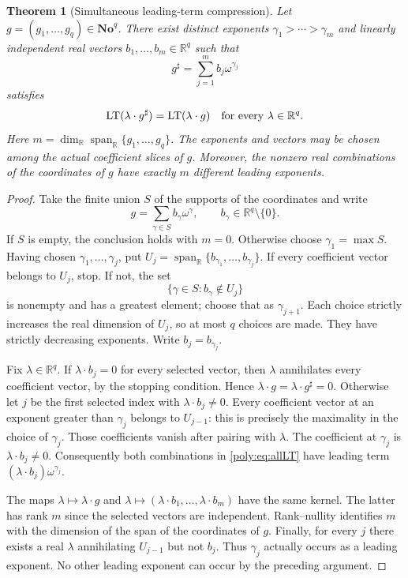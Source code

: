 \documentclass[11pt,a4paper]{article}
\numberwithin{equation}{section}
\newtheorem{theorem}{Theorem}[section]
\theoremstyle{plain}
\newcommand{\No}{\mathbf{No}}
\newcommand{\R}{\mathbb R}
\newcommand{\LT}{\operatorname{LT}}
\newcommand{\Span}{\operatorname{span}_{\R}}%
\begin{document}
\begin{theorem}[Simultaneous leading-term compression]\label{poly:thm:pivot}
Let $g=(g_1,\ldots,g_q)\in\No^q$. There exist distinct exponents
$\gamma_1>\cdots>\gamma_m$ and linearly independent real vectors
$b_1,\ldots,b_m\in\R^q$ such that
\begin{equation}\label{poly:eq:sharp}
 g^\sharp=\sum_{j=1}^m b_j\omega^{\gamma_j}
\end{equation}
satisfies
\begin{equation}\label{poly:eq:allLT}
 \LT(\lambda\cdot g^\sharp)=\LT(\lambda\cdot g)
 \quad\hbox{for every }\lambda\in\R^q.
\end{equation}
Here $m=\dim_{\R}\Span\{g_1,\ldots,g_q\}$. The exponents and vectors may be
chosen among the actual coefficient slices of $g$. Moreover, the nonzero
real combinations of the coordinates of $g$ have exactly $m$ different
leading exponents.
\end{theorem}
\begin{proof}
Take the finite union $S$ of the supports of the coordinates and write
\[
 g=\sum_{\gamma\in S}b_\gamma\omega^\gamma,
 \qquad b_\gamma\in\R^q\setminus\{0\}.
\]
If $S$ is empty, the conclusion holds with $m=0$. Otherwise choose
$\gamma_1=\max S$. Having chosen $\gamma_1,\ldots,\gamma_j$, put
$U_j=\Span\{b_{\gamma_1},\ldots,b_{\gamma_j}\}$. If every coefficient
vector belongs to $U_j$, stop. If not, the set
\[
 \{\gamma\in S:b_\gamma\notin U_j\}
\]
is nonempty and has a greatest element; choose that as $\gamma_{j+1}$.
Each choice strictly increases the real dimension of $U_j$, so at most
$q$ choices are made. They have strictly decreasing exponents. Write
$b_j=b_{\gamma_j}$.

Fix $\lambda\in\R^q$. If $\lambda\cdot b_j=0$ for every selected vector,
then $\lambda$ annihilates every coefficient vector, by the stopping
condition. Hence $\lambda\cdot g=\lambda\cdot g^\sharp=0$.
Otherwise let $j$ be the first selected index with
$\lambda\cdot b_j\ne0$. Every coefficient vector at an exponent greater
than $\gamma_j$ belongs to $U_{j-1}$: this is precisely the maximality in
the choice of $\gamma_j$. Those coefficients vanish after pairing with
$\lambda$. The coefficient at $\gamma_j$ is $\lambda\cdot b_j\ne0$.
Consequently both combinations in \eqref{poly:eq:allLT} have leading term
$(\lambda\cdot b_j)\omega^{\gamma_j}$.

The maps $\lambda\mapsto\lambda\cdot g$ and
$\lambda\mapsto(\lambda\cdot b_1,\ldots,\lambda\cdot b_m)$ have the
same kernel. The latter has rank $m$ since the selected vectors are
independent. Rank--nullity identifies $m$ with the dimension of the span
of the coordinates of $g$.
Finally, for every $j$ there exists a real $\lambda$ annihilating
$U_{j-1}$ but not $b_j$. Thus $\gamma_j$ actually occurs as a leading
exponent. No other leading exponent can occur by the preceding argument.
\end{proof}
\end{document}
